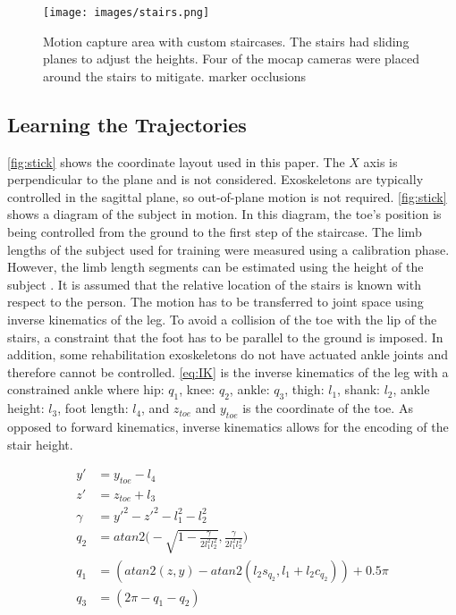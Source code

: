 \begin{figure}
    \centering 
    \texttt{[image: images/stairs.png]}
    \caption{Motion capture area with custom staircases. The stairs had sliding planes to adjust the heights. Four of the mocap cameras were placed around the stairs to mitigate. marker occlusions}
    \label{fig:mocap} 
\end{figure} 

\subsection{Learning the Trajectories} 
\autoref{fig:stick} shows the coordinate layout used in this paper. The $X$ axis is perpendicular to the plane and is not considered. Exoskeletons are typically controlled in the sagittal plane, so out-of-plane motion is not required. \autoref{fig:stick} shows a diagram of the subject in motion. In this diagram, the toe's position is being controlled from the ground to the first step of the staircase. The limb lengths of the subject used for training were measured using a calibration phase. However, the limb length segments can be estimated using the height of the subject \cite{anthropomorphic}. It is assumed that the relative location of the stairs is known with respect to the person. The motion has to be transferred to joint space using inverse kinematics of the leg. To avoid a collision of the toe with the lip of the stairs, a constraint that the foot has to be parallel to the ground is imposed. In addition, some rehabilitation exoskeletons do not have actuated ankle joints and therefore cannot be controlled.  \autoref{eq:IK} is the inverse kinematics of the leg with a constrained ankle where hip: $q_1$, knee: $q_2$, ankle: $q_3$, thigh: $l_1$, shank: $l_2$, ankle height: $l_3$, foot length: $l_4$, and $z_{toe}$ and $y_{toe}$ is the coordinate of the toe. As opposed to forward kinematics, inverse kinematics allows for the encoding of the stair height. 

\begin{equation} 
    \begin{aligned} 
        y' &= y_{toe} - l_4 \\ 
        z' &= z_{toe} + l_3 \\  
        \gamma &= y'^2 - z'^2 - l_1^2  - l_2^2 \\ 
        q_2 &= atan2 \Bigg( -\sqrt{1 - \frac{\gamma }{2 l_1^2 l_2^2}}, \frac{\gamma}{2 l_1^2 l_2^2}\Bigg)\\ 
        q_1 &= (atan2(z, y) - atan2( l_2 s_{q_2}, l_1 + l_2 c_{q_2})) + 0.5\pi \\ 
        q_3 &= (2\pi - q_1 - q_2) 
    \end{aligned} 
    \label{eq:IK} 
\end{equation} 

